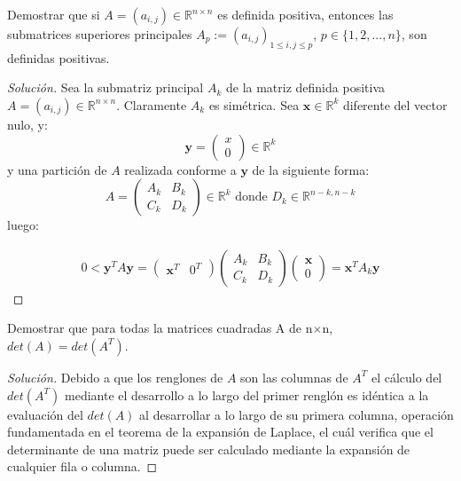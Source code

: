 \documentclass[12pt]{book}
\newcommand{\R}{\mathbb{R}}
\newenvironment{solucion}
  {\renewcommand\qedsymbol{$\square$}\begin{proof}[Solución]}
  {\end{proof}}
\begin{document}
\eje Demostrar que si $A=(a_{i,j})\in \R^{n\times n}$ es definida positiva, entonces las submatrices superiores principales  $A_p:= (a_{i,j})_{1\leq i, j\leq p}$, $p\in\{1,2,...,n\}$, son definidas positivas.

\begin{solucion}
Sea la submatriz principal $A_k$ de la matriz definida positiva $A=(a_{i,j})\in \R^{n\times n}$. Claramente $A_k$ es simétrica. 
Sea $\bm{x}\in \R^k$ diferente del vector nulo, y:  
    \[\bm{y}=\begin{pmatrix}x\\0\end{pmatrix} \in \R^k\] 
y una partición de $A$ realizada conforme a $\bm{y}$ de la siguiente forma: 
    \[A=\begin{pmatrix}A_k & B_k\\ C_k & D_k\end{pmatrix} \in \R^k \textrm{ donde }D_k \in \R^{n-k,n-k}\]
luego:

\begin{align*}
    0< \bm{y}^TA\bm{y}=\begin{pmatrix}\bm{x}^T & 0^T\end{pmatrix}\begin{pmatrix}A_k & B_k\\ C_k & D_k\end{pmatrix}\begin{pmatrix}\bm{x} \\ 0\end{pmatrix}=\bm{x}^TA_k\bm{y}
\end{align*}

\end{solucion}
\newpage
\eje Demostrar que para todas la matrices cuadradas A de n$\times$n, $det(A)=det(A^T)$.
\begin{solucion}
Debido a que los renglones de $A$ son las columnas de $A^T$ el cálculo del $det(A^T)$ mediante el desarrollo a lo largo del primer renglón es idéntica a la evaluación del $det(A)$ al desarrollar a lo largo de su primera columna, operación fundamentada en el teorema de la expansión de Laplace, el cuál verifica que el determinante de una matriz puede ser calculado mediante la expansión  de cualquier fila o columna.
\end{solucion}
\end{document}
